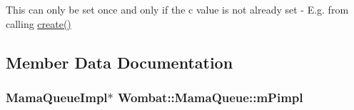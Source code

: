 This can only be set once and only if the c value is not already set -\/ E.g. from calling \hyperlink{classWombat_1_1MamaQueue_af9697625f1bf25772b29dd4c827c2991}{create()} 

\subsection{Member Data Documentation}
\hypertarget{classWombat_1_1MamaQueue_aea38f0077fd452cbb07197e2017b267c}{
\subsubsection[{mPimpl}]{\setlength{\rightskip}{0pt plus 5cm}MamaQueueImpl$\ast$ {\bf Wombat::MamaQueue::mPimpl}}}
\label{classWombat_1_1MamaQueue_aea38f0077fd452cbb07197e2017b267c}
